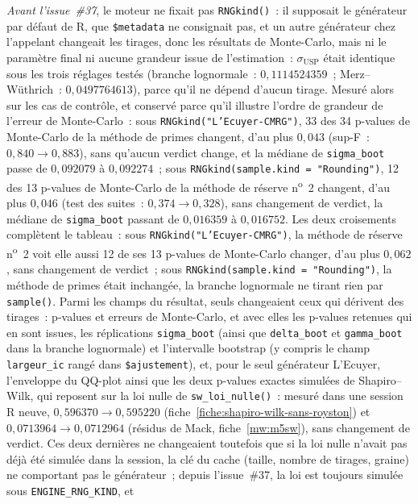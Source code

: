 \documentclass[a4paper,11pt]{article}
\newcommand{\code}[1]{\texttt{\small #1}}
\begin{document}
\emph{Avant l'issue~\#37}, le moteur ne fixait pas \code{RNGkind()}~: il supposait le
générateur par défaut de R, que \code{\$metadata} ne consignait pas, et un autre générateur
chez l'appelant changeait les tirages, donc les résultats de Monte-Carlo, mais ni le paramètre
final ni aucune grandeur issue de l'estimation~: $\sigma_{\mathrm{USP}}$ était identique sous
les trois réglages testés (branche lognormale~: $0{,}1114524359$~; Merz--Wüthrich~:
$0{,}0497764613$), parce qu'il ne dépend d'aucun tirage. Mesuré alors sur les cas de
contrôle, et conservé parce qu'il illustre l'ordre de grandeur de l'erreur de Monte-Carlo~:
sous \code{RNGkind("L'Ecuyer-CMRG")}, 33 des 34 p-values de Monte-Carlo de la
méthode de primes changent, d'au plus $0{,}043$ (sup-F~: $0{,}840 \to 0{,}883$),
sans qu'aucun verdict change, et la médiane de \code{sigma\_boot} passe de
$0{,}092079$ à $0{,}092274$~; sous \code{RNGkind(sample.kind = "Rounding")},
12 des 13 p-values de Monte-Carlo de la méthode de réserve n\textsuperscript{o}~2
changent, d'au plus $0{,}046$ (test des suites~: $0{,}374 \to 0{,}328$), sans
changement de verdict, la médiane de \code{sigma\_boot} passant de $0{,}016359$
à $0{,}016752$. Les deux croisements complètent le tableau~: sous
\code{RNGkind("L'Ecuyer-CMRG")}, la méthode de réserve n\textsuperscript{o}~2
voit elle aussi 12 de ses 13 p-values de Monte-Carlo changer, d'au plus
$0{,}062$, sans changement de verdict~; sous
\code{RNGkind(sample.kind = "Rounding")}, la méthode de primes était inchangée,
la branche lognormale ne tirant rien par \code{sample()}. Parmi les champs du
résultat, seuls changeaient ceux qui dérivent des tirages~: p-values et erreurs de
Monte-Carlo, et avec elles les p-values retenues qui en sont issues, les
réplications \code{sigma\_boot} (ainsi que \code{delta\_boot} et
\code{gamma\_boot} dans la branche lognormale) et l'intervalle bootstrap (y compris le champ
\code{largeur\_ic} rangé dans \code{\$ajustement}), et, pour le seul
générateur L'Ecuyer, l'enveloppe du QQ-plot ainsi que les deux p-values
exactes simulées de Shapiro--Wilk, qui reposent sur la loi nulle de
\code{sw\_loi\_nulle()}~: mesuré dans une session R neuve, $0{,}596370 \to
0{,}595220$ (fiche~\ref{fiche:shapiro-wilk-sans-royston}) et $0{,}0713964 \to 0{,}0712964$ (résidus de
Mack, fiche~\ref{mw:m5sw}), sans changement de verdict. Ces deux dernières ne
changeaient toutefois que si la loi nulle n'avait pas déjà été simulée dans la
session, la clé du cache (taille, nombre de tirages, graine) ne comportant pas le
générateur~; depuis l'issue~\#37, la loi est toujours simulée sous \code{ENGINE\_RNG\_KIND}, et
\end{document}
